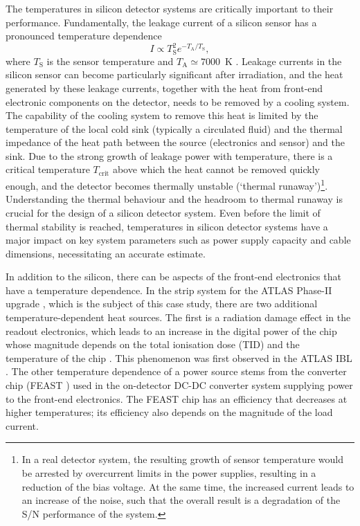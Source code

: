 The temperatures in silicon detector systems are critically important to their performance. Fundamentally, the leakage current of a silicon sensor has a pronounced temperature dependence 
\begin{equation}
I\propto T_\text{S}^2e^{-T_\text{A}/T_\text{S}},
\label{eq:leakage_current_temp_dependence}
\end{equation}
where $T_\text{S}$ is the sensor temperature and $T_\text{A}\simeq7000$~K \cite{Chilingarov_2013}. Leakage currents in the silicon sensor can become particularly significant after irradiation, and the heat generated by these leakage currents, together with the heat from front-end electronic components on the detector, needs to be removed by a cooling system. The capability of the cooling system to remove this heat is limited by the temperature of the local cold sink (typically a circulated fluid) and the thermal impedance of the heat path between the source (electronics and sensor) and the sink. Due to the strong growth of leakage power with temperature, there is a critical temperature $T_\text{crit}$ above which the heat cannot be removed quickly enough, and the detector becomes thermally unstable (`thermal runaway')\footnote{In a real detector system, the resulting growth of sensor temperature would be arrested by overcurrent limits in the power supplies, resulting in a reduction of the bias voltage. At the same time, the increased current leads to an increase of the noise, such that the overall result is a degradation of the S/N performance of the system.}. Understanding the thermal behaviour and the headroom to thermal runaway is crucial for the design of a silicon detector system. Even before the limit of thermal stability is reached, temperatures in silicon detector systems have a major impact on key system parameters such as power supply capacity and cable dimensions, necessitating an accurate estimate.

In addition to the silicon,
there can be aspects of the front-end electronics that have a temperature dependence. In the strip system for the ATLAS Phase-II upgrade \cite{Collaboration:2017mtb}, which is the subject of this case study, there are two additional temperature-dependent heat sources. The first is a radiation damage effect in the readout electronics, which leads to an increase in the digital power of the chip whose magnitude depends on the total ionisation dose (TID) and the temperature of the chip \cite{Collaboration:2017mtb}. This phenomenon was first observed in the ATLAS IBL \cite{ATL-INDET-PUB-2017-001}. The other temperature dependence of a power source stems from the converter chip (FEAST \cite{1748-0221-6-11-C11035}) used in the on-detector DC-DC converter system supplying power to the front-end electronics. The FEAST chip has an efficiency that decreases at higher temperatures; its efficiency also depends on the magnitude of the load current.


